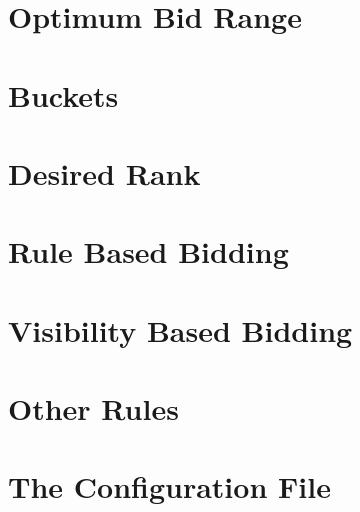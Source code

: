 \chapter{Optimum Bid Range}\label{ch:bid_range}

\newpage

\chapter{Buckets}\label{ch:buckets}

\newpage

\chapter{Desired Rank}\label{ch:desired_rank}

\newpage

\chapter{Rule Based Bidding}\label{ch:rule_based_bids}

\newpage

\chapter{Visibility Based Bidding}\label{ch:visibility_bids}

\newpage

\chapter{Other Rules}\label{ch:other_rules}

\newpage

\chapter{The Configuration File}\label{ch:config_file}

\newpage



% 


